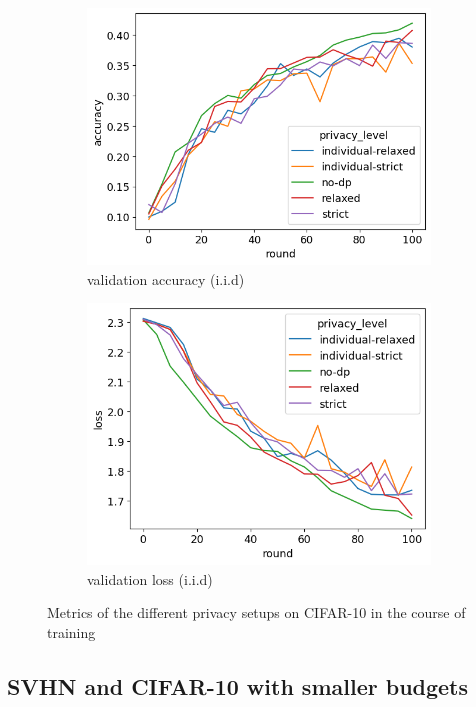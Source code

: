 \begin{figure}[tb]
\begin{subfigure}{0.45\textwidth}
		\includegraphics[width=\textwidth]{Bilder/cifar10-accuracy-iid.png}
		\caption{validation accuracy (i.i.d)}
	\end{subfigure}
	\begin{subfigure}{0.45\textwidth}
		\centering
		\includegraphics[width=\textwidth]{Bilder/cifar10-loss-iid.png}
		\caption{validation loss (i.i.d)}
	\end{subfigure}
	\caption{Metrics of the different privacy setups on CIFAR-10 in the course of training}
	\label{fig:fed-cifar10-results}
\end{figure}

\subsection{SVHN and CIFAR-10 with smaller budgets}

